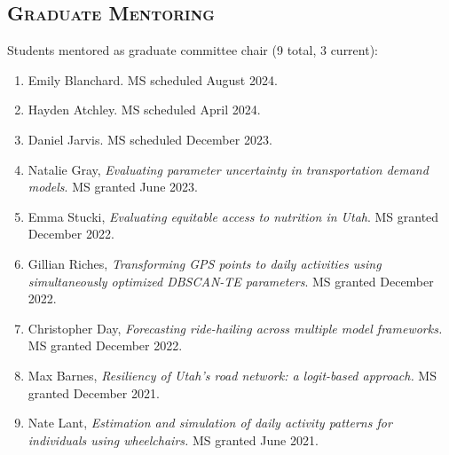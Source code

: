 \documentclass[margin,line]{res}
\newcounter{enuminitialize}
\newenvironment{myenum}[1][]
{%
 \setcounter{enuminitialize}{#1}
 \addtocounter{enuminitialize}{2}
 \begin{enumerate}[left= 4pt, itemsep=12pt, start=\value{enuminitialize}, label=\arabic*\addtocounter{enumi}{-2}]
}
{%
 \end{enumerate}
}
\newcommand{\secfont}{\scshape }
\begin{document}
\begin{resume}
\noindent\makebox[\linewidth]{\rule{\linewidth}{0.4pt}}
\section{\secfont Graduate Mentoring}
Students mentored as graduate committee chair (9 total, 3 current):
\vspace{0.3cm}
\begin{myenum}[9]
  \item Emily Blanchard. MS scheduled August 2024.
  \item Hayden Atchley. MS scheduled April 2024.
  \item Daniel Jarvis. MS scheduled December 2023.
  \item Natalie Gray, \textit{Evaluating parameter uncertainty in transportation demand models}. MS granted June 2023.
  \item Emma Stucki, \textit{Evaluating equitable access to nutrition in Utah}. MS granted December 2022.
  \item Gillian Riches, \textit{Transforming GPS points to daily activities using simultaneously optimized DBSCAN-TE parameters}. MS granted December 2022.
  \item Christopher Day, \textit{Forecasting ride-hailing across multiple model frameworks.} MS granted December 2022.
  \item Max Barnes, \textit{Resiliency of Utah's road network: a logit-based approach.} MS granted December 2021.
  \item Nate Lant, \textit{Estimation and simulation of daily activity patterns for individuals using wheelchairs.} MS granted June 2021.
\end{myenum}


\end{resume}
\end{document}
